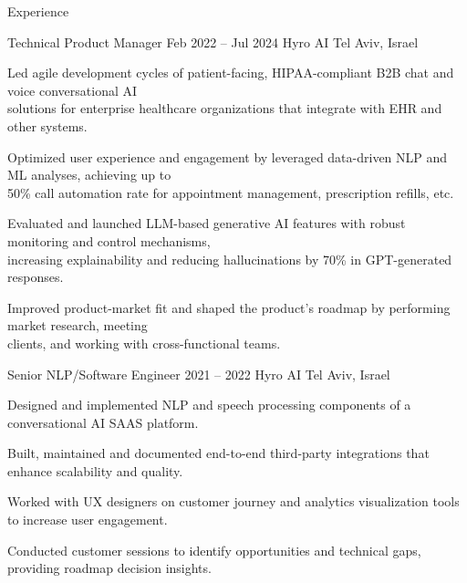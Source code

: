\documentclass{resume} %
\begin{document}
\begin{rSection}{Experience}

\begin{rSubsection}
	{Technical Product Manager}
	{Feb 2022 -- Jul 2024}
	{Hyro AI}
	{Tel Aviv, Israel}

	\setlength{\itemindent}{.5cm}
	
	
	
	\item Led agile development cycles of patient-facing, HIPAA-compliant B2B chat and voice conversational AI \\\hspace*{.5cm}solutions for enterprise healthcare organizations that integrate with EHR and other systems.
	\item Optimized user experience and engagement by leveraged data-driven NLP and ML analyses, achieving up to \\\hspace*{.5cm}50\% call automation rate for appointment management, prescription refills, etc.
	\item Evaluated and launched LLM-based generative AI features with robust monitoring and control mechanisms,\\\hspace*{.5cm}increasing explainability and reducing hallucinations by 70\% in GPT-generated responses.
	\item Improved product-market fit and shaped the product's roadmap by performing market research, meeting\\\hspace*{.5cm}clients, and working with cross-functional teams.
\end{rSubsection}

\begin{rSubsection}
	{Senior NLP/Software Engineer}
	{2021 -- 2022}
	{Hyro AI}
	{Tel Aviv, Israel}
	
	\setlength{\itemindent}{.5cm}
	
	\item Designed and implemented NLP and speech processing components of a conversational AI SAAS platform.
	\item Built, maintained and documented end-to-end third-party integrations that enhance scalability and quality.
	\item Worked with UX designers on customer journey and analytics visualization tools to increase user engagement.
	\item Conducted customer sessions to identify opportunities and technical gaps, providing roadmap decision insights.
\end{rSubsection}


\end{rSection}
\end{document}
